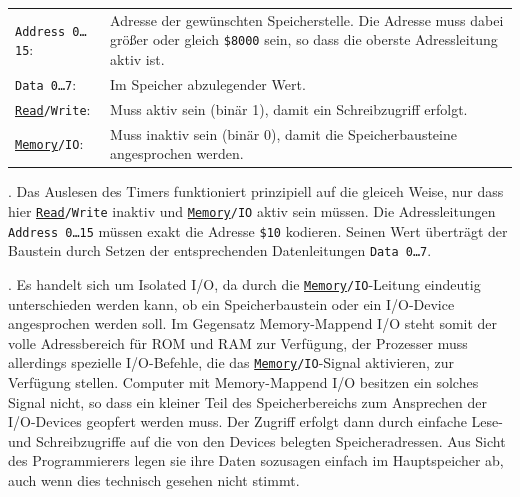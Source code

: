{
    \renewcommand{\arraystretch}{1.5}
    \small

    \begin{tabularx}{\textwidth}{p{}X}
        \texttt{Address 0…15}:
        &
        Adresse der gewünschten Speicherstelle.
        Die Adresse muss dabei größer oder gleich \texttt{\$8000} sein, so dass
        die oberste Adressleitung aktiv ist.
        \\

        \texttt{Data 0…7}:
        &
        Im Speicher abzulegender Wert.
        \\

        \texttt{\underline{Read}/Write}:
        &
        Muss aktiv sein (binär 1), damit ein Schreibzugriff erfolgt.
        \\

        \texttt{\underline{Memory}/IO}:
        &
        Muss inaktiv sein (binär 0), damit die Speicherbausteine
        angesprochen werden.
        \\
    \end{tabularx}
}

. Das Auslesen des Timers funktioniert prinzipiell auf die gleiceh Weise, nur
dass hier \texttt{\underline{Read}/Write} inaktiv und \texttt{\underline{Memory}/IO}
aktiv sein müssen. Die Adressleitungen \texttt{Address 0…15} müssen exakt die
Adresse \texttt{\$10} kodieren. Seinen Wert überträgt der Baustein durch Setzen
der entsprechenden Datenleitungen \texttt{Data 0…7}.

. Es handelt sich um \glqq{}Isolated I/O\grqq{}, da durch die
\texttt{\underline{Memory}/IO}-Leitung eindeutig unterschieden werden kann,
ob ein Speicherbaustein oder ein I/O-Device angesprochen werden soll. Im Gegensatz
\glqq{}Memory-Mappend I/O\grqq{} steht somit der volle Adressbereich für ROM und
RAM zur Verfügung, der Prozesser muss allerdings spezielle I/O-Befehle, die das
\texttt{\underline{Memory}/IO}-Signal aktivieren, zur Verfügung stellen. Computer
mit \glqq{}Memory-Mappend I/O\grqq{} besitzen ein solches Signal nicht, so dass
ein kleiner Teil des Speicherbereichs zum Ansprechen der I/O-Devices geopfert
werden muss. Der Zugriff erfolgt dann durch einfache Lese- und Schreibzugriffe
auf die von den Devices belegten Speicheradressen. Aus Sicht des Programmierers
legen sie ihre Daten sozusagen einfach im Hauptspeicher ab, auch wenn dies
technisch gesehen nicht stimmt.

